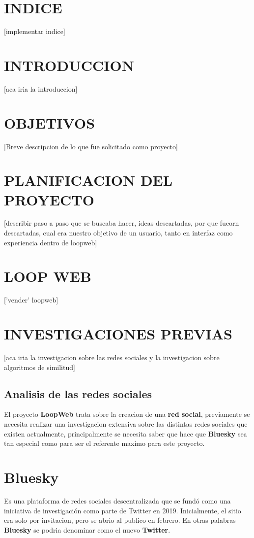 
\section{INDICE}
[implementar indice]
\newpage
\section{INTRODUCCION}
[aca iria la introduccion]
\section{OBJETIVOS}
[Breve descripcion de lo que fue solicitado como proyecto]
\section{PLANIFICACION DEL PROYECTO}
[describir paso a paso que se buscaba hacer, ideas descartadas, por que fueorn descartadas, cual era nuestro objetivo de un usuario, tanto en interfaz como experiencia dentro de loopweb]
\section{LOOP WEB}
['vender' loopweb]
\section{INVESTIGACIONES PREVIAS}
[aca iria la investigacion sobre las redes sociales y la investigacion sobre algoritmos de similitud]
\subsection{{\textbf{Analisis de las redes sociales}}}
El proyecto \textbf{LoopWeb}
trata sobre la creacion de una \textbf{red social}, previamente se necesita realizar una investigacion extensiva sobre las distintas redes sociales que existen actualmente, 
principalmente se necesita saber que hace que \textbf{Bluesky} sea tan especial como para ser el referente maximo para este proyecto.

\section{{\textbf{Bluesky}}}
Es una plataforma de redes sociales descentralizada que se fundó como una iniciativa de investigación como parte de Twitter en 2019. 
Inicialmente, el sitio era solo por invitacion, pero se abrio al publico en febrero.
En otras palabras \textbf{Bluesky} se podria denominar como el nuevo \textbf{Twitter}.

